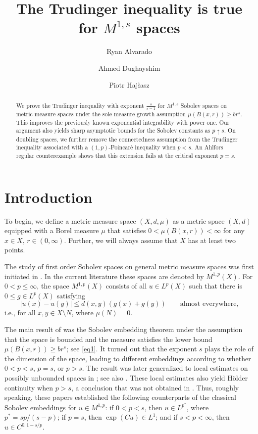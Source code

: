 \documentclass[12pt,leqno]{amsart}
\title[Trudinger inequality]{The Trudinger inequality is true for $M^{1,s}$ spaces}
\author[R.~Alvarado]{Ryan Alvarado}
\author[A.~Dughayshim]{Ahmed Dughayshim}
\author[P.~Haj\l{}asz]{Piotr Haj\l{}asz}
\theoremstyle{definition}
\numberwithin{theorem}{section} \numberwithin{equation}{section}
\begin{document}
\sloppy




\begin{abstract}
We prove the Trudinger inequality with exponent $\frac{s}{s-1}$ for $M^{1,s}$ Sobolev spaces on metric measure spaces under the sole measure growth assumption $\mu(B(x,r))\ge br^s$. This improves the previously known exponential integrability with power one. Our argument also yields sharp asymptotic bounds for the Sobolev constants as $p\uparrow s$. On doubling spaces, we further remove the connectedness assumption from the Trudinger inequality associated with a $(1,p)$-Poincaré inequality when $p<s$. An Ahlfors regular counterexample shows that this extension fails at the critical exponent $p=s$.
\end{abstract}

\maketitle

\section{Introduction}

To begin, we define a metric measure space $(X,d,\mu )$ as a metric space $(X,d)$ equipped with a Borel measure $\mu$ that satisfies $0<\mu(B(x,r))<\infty$ for any $x\in X$, $r\in(0,\infty)$. Further, we will always assume that $X$ has at least two points.

The study of first order Sobolev spaces on general metric measure spaces was first initiated in \cite{hajlasz2}. In the current literature these spaces are denoted by $M^{1,p}(X)$. For $0<p\leq\infty$, the space $M^{1,p}(X)$ consists of all $u\in L^p(X)$ such that there is $0\leq g\in L^p(X)$ satisfying
\begin{equation}
\label{eq14}
|u(x)-u(y)|\leq d(x,y)(g(x)+g(y))
\qquad 
\text{almost everywhere,}
\end{equation}
i.e., for all $x,y\in X\setminus N$, where $\mu(N)=0$. 


The main result of \cite[Theorem~6]{hajlasz2} was the Sobolev embedding theorem under the assumption that the space is bounded and the measure satisfies the lower bound $\mu(B(x,r))\geq br^s$; see \eqref{eq1}. It turned out that the exponent $s$ plays the role of the dimension of the space, leading to different embeddings according to whether $0<p<s$, $p=s$, or $p>s$. The result was later generalized to local estimates on possibly unbounded spaces in \cite[Theorem~8.7]{hajlasz}; see also \cite[Theorem~6]{AGH}. These local estimates also yield H\"older continuity when $p>s$, a conclusion that was not obtained in \cite{hajlasz2}. Thus, roughly speaking, these papers established the following counterparts of the classical Sobolev embeddings for $u\in M^{1,p}$: if $0<p<s$, then $u\in L^{p^*}$, where $p^*=sp/(s-p)$; if $p=s$, then $\exp(Cu)\in L^1$; and if $s<p<\infty$, then $u\in C^{0,1-s/p}$.
\end{document}
